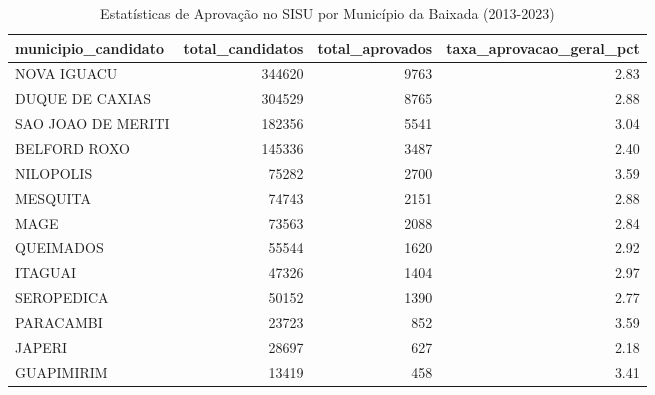 \begin{table}
\caption{Estatísticas de Aprovação no SISU por Município da Baixada (2013-2023)}
\label{tab:aprovacoes_sisu}
\begin{tabular}{lrrr}
\toprule
municipio_candidato & total_candidatos & total_aprovados & taxa_aprovacao_geral_pct \\
\midrule
NOVA IGUACU & 344620 & 9763 & 2.83 \\
DUQUE DE CAXIAS & 304529 & 8765 & 2.88 \\
SAO JOAO DE MERITI & 182356 & 5541 & 3.04 \\
BELFORD ROXO & 145336 & 3487 & 2.40 \\
NILOPOLIS & 75282 & 2700 & 3.59 \\
MESQUITA & 74743 & 2151 & 2.88 \\
MAGE & 73563 & 2088 & 2.84 \\
QUEIMADOS & 55544 & 1620 & 2.92 \\
ITAGUAI & 47326 & 1404 & 2.97 \\
SEROPEDICA & 50152 & 1390 & 2.77 \\
PARACAMBI & 23723 & 852 & 3.59 \\
JAPERI & 28697 & 627 & 2.18 \\
GUAPIMIRIM & 13419 & 458 & 3.41 \\
\bottomrule
\end{tabular}
\end{table}
